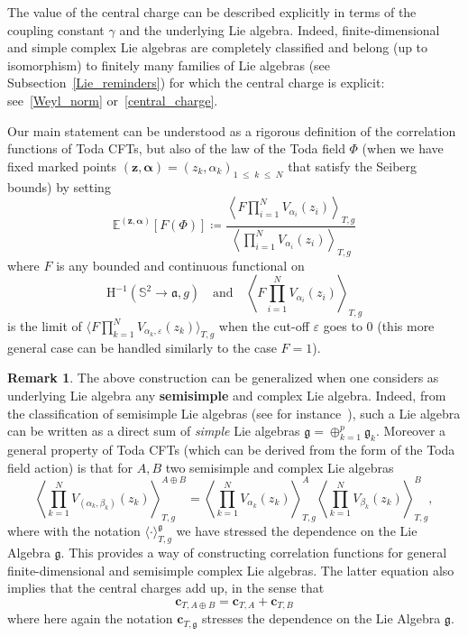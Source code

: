 \documentclass[10pt]{amsart}
\theoremstyle{definition}\newtheorem{defi}[theo]{Definition}\newtheorem{rema}[theo]{Remark}\newtheorem{exam}[theo]{Example}\newtheorem{exem}[theo]{Example}\newtheorem{nota}[theo]{Notation}
\renewcommand{\leq}{\;\leqslant\;}
\newcommand{\frkg}{\mathfrak{g}}
\newcommand{\frka}{\mathfrak{a}}
\newcommand{\rmH}{\mathrm{H}}
\renewcommand*\S{\mathbb{S}}
\newcommand{\E}{\mathbb{E}}
\newcommand{\ps}[1]{\langle #1 \rangle}
\newcommand*\eps{\varepsilon}
\newcommand*\green[1]{#1}
\begin{document}
The value of the central charge can be described explicitly in terms of the coupling constant $\gamma$ and the underlying Lie algebra. Indeed, finite-dimensional and simple complex Lie algebras are completely classified and belong (up to isomorphism) to finitely many families of Lie algebras (see Subsection~\ref{Lie_reminders}) for which the central charge is explicit: see~\eqref{Weyl_norm} or~\eqref{central_charge}.

Our main statement can be understood as a rigorous definition of the correlation functions of Toda CFTs, but also of the law of the Toda field $\green\Phi$ (when we have fixed marked points $(\bm z, \bm \alpha)=(z_k,\alpha_k)_{1 \leq k \leq N}$ that satisfy the Seiberg bounds) by setting
\begin{equation}
\E^{(\bm z,\bm \alpha)}\left[F(\green\Phi)\right]\coloneqq \frac{\left\langle F\prod\limits_{i=1}^NV_{\alpha_i}(z_i)\right\rangle_{T,g}}{\left\langle \prod\limits_{i=1}^NV_{\alpha_i}(z_i)\right\rangle_{T,g}}
\end{equation}
where $F$ is any bounded and continuous functional on
\[
\rmH^{-1}\left(\S^2\to\frka,g\right)
 \quad\text{and}\quad \left\langle F\prod_{i=1}^NV_{\alpha_i}(z_i)\right\rangle_{T,g}
\]
is the limit of $\langle F \prod_{k=1}^NV_{\alpha_k,\eps}(z_k)\rangle_{T,g} $ when the cut-off $\eps$ goes to $0$ (this more general case can be handled similarly to the case $F=1$).

\begin{rema}
The above construction can be generalized when one considers as underlying Lie algebra any {\bf semisimple} and complex Lie algebra. Indeed, from the classification of semisimple Lie algebras (see for instance~\cite{Hum72}), such a Lie algebra can be written as a direct sum of \emph{simple} Lie algebras $\frkg=\oplus_{k=1}^p \frkg_k$. Moreover a general property of Toda CFTs (which can be derived from the form of the Toda field action) is that for $A,B$ two semisimple and complex Lie algebras
\begin{equation}
\left\langle\prod_{k=1}^NV_{(\alpha_k,\beta_k)}(z_k)\right\rangle_{T, g}^{A\oplus B}=\left\langle\prod_{k=1}^NV_{\alpha_k}(z_k)\right\rangle_{T,g}^A\left\langle\prod_{k=1}^NV_{\beta_k}(z_k)\right\rangle_{T,g}^B,
\end{equation}
where with the notation $\ps{\cdot}_{T, g}^{\frkg}$ we have stressed the dependence on the Lie Algebra $\frkg$. This provides a way of constructing correlation functions for general finite-dimensional and semisimple complex Lie algebras. The latter equation also implies that the central charges add up, in the sense that
\begin{equation}
\bm c_{T,A\oplus B}=\bm c_{T,A}+\bm c_{T,B}
\end{equation}
where here again the notation $ \bm c_{T,\frkg}$ stresses the dependence on the Lie Algebra $\frkg$.
\end{rema}
\end{document}
